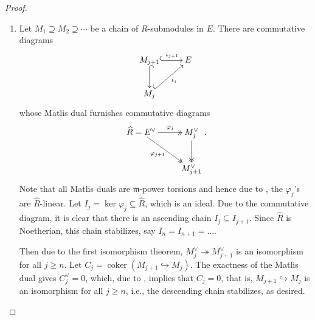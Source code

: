 \documentclass[10pt]{article}
\theoremstyle{thmstyle}
\theoremstyle{defstyle}
\newcommand{\coker}{\operatorname{coker}}
\newcommand{\frakm}{\mathfrak{m}} %
\newcommand{\wh}[1]{\widehat{#1}}
\newcommand{\onto}{\twoheadrightarrow}
\newcommand{\into}{\hookrightarrow}
\renewcommand{\ge}{\geqslant}
\begin{document}
\begin{proof}
\begin{enumerate}[label=(\arabic*)]
    \item Let $M_1\supseteq M_2\supseteq\cdots$ be a chain of $R$-submodules in $E$. There are commutative diagrams 
    \begin{equation*}
        \xymatrix {
            M_{j + 1}\ar@{^{(}->}[r]^-{\iota_{j + 1}}\ar@{^{(}->}[d] & E\\
            M_j\ar@{^{(}->}[ru]_-{\iota_j}
        }
    \end{equation*}
    whose Matlis dual furnishes commutative diagrams 
    \begin{equation*}
        \xymatrix {
            \wh R = E^\vee\ar@{->>}[r]^-{\varphi_j}\ar@{->>}[rd]_-{\varphi_{j + 1}} & M_{j}^\vee\ar@{->>}[d] \\
            & M_{j + 1}^\vee
        }.
    \end{equation*}
    Note that all Matlis duals are $\frakm$-power torsions and hence due to , the $\varphi_j$'s are $\wh R$-linear. Let $I_j = \ker\varphi_j\subseteq\wh R$, which is an ideal. Due to the commutative diagram, it is clear that there is an ascending chain $I_j\subseteq I_{j + 1}$. Since $\wh R$ is Noetherian, this chain stabilizes, say $I_n = I_{n + 1} = \dots$. 
    
    Then due to the first isomorphism theorem, $M_j^\vee\onto M_{j + 1}^\vee$ is an isomorphism for all $j\ge n$. Let $C_j = \coker\left(M_{j + 1}\into M_j\right)$. The exactness of the Matlis dual gives $C_j^\vee = 0$, which, due to , implies that $C_j = 0$, that is, $M_{j + 1}\into M_j$ is an isomorphism for all $j\ge n$, i.e., the descending chain stabilizes, as desired. \qedhere
\end{enumerate}
\end{proof}
\end{document}
